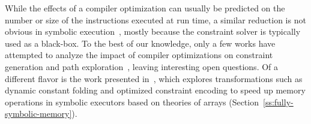 While the effects of a compiler optimization can usually be predicted on the number or size of the instructions executed at run time, a similar reduction is not obvious in symbolic execution~\cite{DOZ-ISSRE15}, mostly because the constraint solver is typically used as a black-box. To the best of our knowledge, only a few works have attempted to analyze the impact of compiler optimizations on constraint generation and path exploration~\cite{WKC-HOTOS13,DOZ-ISSRE15}, leaving interesting open questions. Of a different flavor is the work presented in~\cite{PMZ-ISSTA17}, which explores transformations such as dynamic constant folding and optimized constraint encoding to speed up memory operations in symbolic executors based on theories of arrays (Section~\ref{ss:fully-symbolic-memory}).


